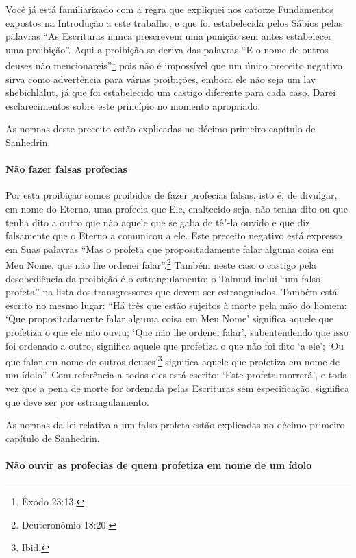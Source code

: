 \begin{multicols}{2}
Você já está familiarizado com a regra que expliquei nos catorze
Fundamentos expostos na Introdução a este trabalho, e que foi
estabelecida pelos Sábios pelas palavras ``As Escrituras nunca
prescrevem uma punição sem antes estabelecer uma proibição''. Aqui a
proibição se deriva das palavras ``E o nome de outros deuses não
mencionareis''\footnote{Êxodo 23:13.} pois não é impossível que um único
preceito negativo sirva como advertência para várias proibições, embora
ele não seja um lav shebichlalut\starr, já que foi estabelecido um castigo
diferente para cada caso. Darei esclarecimentos sobre este princípio no
momento apropriado.

As normas deste preceito estão explicadas no décimo primeiro capítulo
de Sanhedrin\starr.

\paragraph{Não fazer falsas profecias}

Por esta proibição somos proibidos de fazer profecias falsas, isto é,
de divulgar, em nome do Eterno, uma profecia que Ele, enaltecido seja,
não tenha dito ou que tenha dito a outro que não aquele que se gaba de tê"-la
ouvido e que diz falsamente que o Eterno a comunicou a ele. Este
preceito negativo está expresso em Suas palavras ``Mas o profeta que propositadamente
falar alguma coisa em Meu Nome, que não lhe ordenei falar''.\footnote{Deuteronômio 18:20.}
Também neste caso o castigo pela desobediência da proibição é o
estrangulamento: o Talmud\starr{} inclui ``um falso profeta'' na lista dos
transgressores que devem ser estrangulados. Também está escrito no mesmo
lugar: ``Há três que estão sujeitos à morte pela mão do homem: `Que propositadamente
falar alguma coisa em Meu Nome' significa aquele que profetiza o que ele
não ouviu; `Que não lhe ordenei falar', subentendendo que isso foi
ordenado a outro, significa aquele que profetiza o que não foi dito `a
ele'; `Ou que falar em nome de outros deuses'\footnote{Ibid.} significa aquele
que profetiza em nome de um ídolo''. Com referência a todos eles está
escrito: `Este profeta morrerá', e toda vez que a pena de morte for
ordenada pelas Escrituras sem especificação, significa que deve ser por
estrangulamento.

As normas da lei relativa a um falso profeta estão explicadas no décimo
primeiro capítulo de Sanhedrin\starr.

\paragraph{Não ouvir as profecias de quem profetiza em nome de um ídolo}


\end{multicols}

